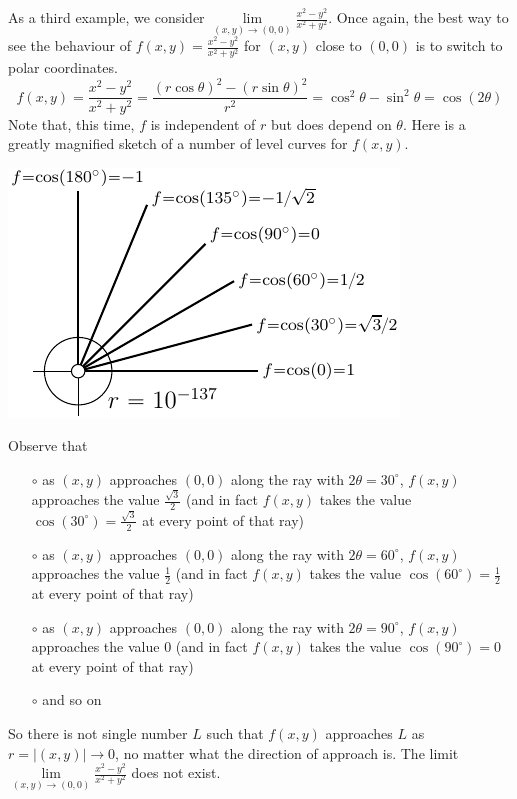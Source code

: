 \begin{eg}\label{ex LIMtwodC}
As a third example, we consider
$\lim\limits_{(x,y)\rightarrow (0,0)}\frac{x^2-y^2}{x^2+y^2}$.
Once again, the best way to see the behaviour of 
$f(x,y)=\frac{x^2-y^2}{x^2+y^2}$ for $(x,y)$ close to $(0,0)$ is to 
switch to polar coordinates.
$$
f(x,y)=\frac{x^2-y^2}{x^2+y^2}=\frac{(r\cos\theta)^2-(r\sin\theta)^2}{r^2}
  =\cos^2\theta-\sin^2\theta
  =\cos(2\theta)
$$
Note that, this time, $f$ is independent of $r$ but does depend on $\theta$.
Here is a greatly magnified sketch of a number of level curves for $f(x,y)$.
\begin{efig}
\begin{center}
   \includegraphics{polarD.pdf}
\end{center}
\end{efig}
Observe that
\begin{itemize}
\item[$\circ$] as $(x,y)$ approaches $(0,0)$ along the ray with 
$2\theta =30^\circ$, $f(x,y)$ approaches the value $\frac{\sqrt{3}}{2}$ 
(and in fact $f(x,y)$ takes the value $\cos(30^\circ)=\frac{\sqrt{3}}{2}$ 
at every point of that ray)
\item[$\circ$] as $(x,y)$ approaches $(0,0)$ along the ray with 
$2\theta =60^\circ$, $f(x,y)$ approaches the value $\frac{1}{2}$ 
(and in fact $f(x,y)$ takes the value $\cos(60^\circ)=\frac{1}{2}$ 
at every point of that ray)
\item[$\circ$] as $(x,y)$ approaches $(0,0)$ along the ray with 
$2\theta =90^\circ$, $f(x,y)$ approaches the value $0$ 
(and in fact $f(x,y)$ takes the value $\cos(90^\circ)=0$ 
at every point of that ray)
\item[$\circ$] and so on
\end{itemize}
So there is not single number $L$ such that $f(x,y)$ approaches
$L$ as $r=|(x,y)|\rightarrow 0$, no matter what the direction of 
approach is. The limit 
$\lim\limits_{(x,y)\rightarrow (0,0)}\frac{x^2-y^2}{x^2+y^2}$
does not exist.



\end{eg}
